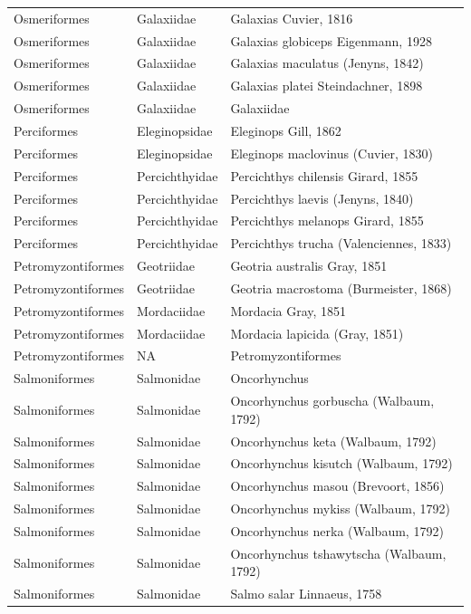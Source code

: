 \documentclass[sn-apa,pdflatex]{sn-jnl}
\begin{document}
\begin{longtable}[t]{>{\raggedright\arraybackslash}p{10em}>{\raggedright\arraybackslash}p{10em}>{\raggedright\arraybackslash}p{28em}}
Osmeriformes & Galaxiidae & Galaxias Cuvier, 1816\\
Osmeriformes & Galaxiidae & Galaxias globiceps Eigenmann, 1928\\
Osmeriformes & Galaxiidae & Galaxias maculatus (Jenyns, 1842)\\
Osmeriformes & Galaxiidae & Galaxias platei Steindachner, 1898\\
\addlinespace
Osmeriformes & Galaxiidae & Galaxiidae\\
Perciformes & Eleginopsidae & Eleginops Gill, 1862\\
Perciformes & Eleginopsidae & Eleginops maclovinus (Cuvier, 1830)\\
Perciformes & Percichthyidae & Percichthys chilensis Girard, 1855\\
Perciformes & Percichthyidae & Percichthys laevis (Jenyns, 1840)\\
\addlinespace
Perciformes & Percichthyidae & Percichthys melanops Girard, 1855\\
Perciformes & Percichthyidae & Percichthys trucha (Valenciennes, 1833)\\
Petromyzontiformes & Geotriidae & Geotria australis Gray, 1851\\
Petromyzontiformes & Geotriidae & Geotria macrostoma (Burmeister, 1868)\\
Petromyzontiformes & Mordaciidae & Mordacia Gray, 1851\\
\addlinespace
Petromyzontiformes & Mordaciidae & Mordacia lapicida (Gray, 1851)\\
Petromyzontiformes & NA & Petromyzontiformes\\
Salmoniformes & Salmonidae & Oncorhynchus\\
Salmoniformes & Salmonidae & Oncorhynchus gorbuscha (Walbaum, 1792)\\
Salmoniformes & Salmonidae & Oncorhynchus keta (Walbaum, 1792)\\
\addlinespace
Salmoniformes & Salmonidae & Oncorhynchus kisutch (Walbaum, 1792)\\
Salmoniformes & Salmonidae & Oncorhynchus masou (Brevoort, 1856)\\
Salmoniformes & Salmonidae & Oncorhynchus mykiss (Walbaum, 1792)\\
Salmoniformes & Salmonidae & Oncorhynchus nerka (Walbaum, 1792)\\
Salmoniformes & Salmonidae & Oncorhynchus tshawytscha (Walbaum, 1792)\\
\addlinespace
Salmoniformes & Salmonidae & Salmo salar Linnaeus, 1758\\

\end{longtable}
\end{document}
